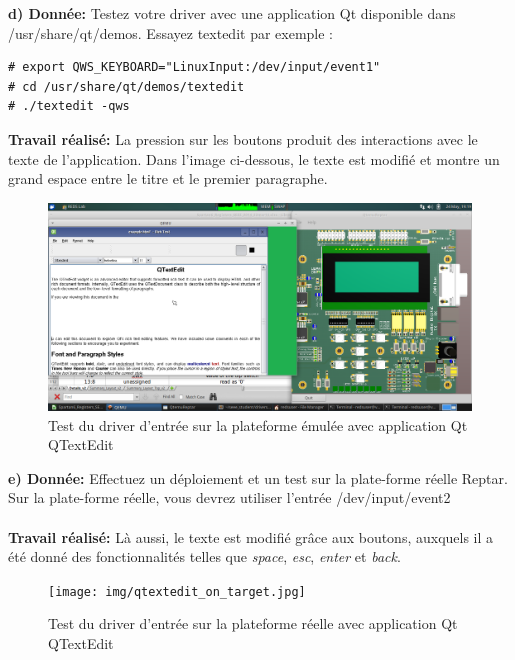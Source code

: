 \textbf{d) Donnée: }Testez votre driver avec une application Qt disponible dans /usr/share/qt/demos. Essayez textedit
par exemple : 
\begin{lstlisting}
# export QWS_KEYBOARD="LinuxInput:/dev/input/event1"
# cd /usr/share/qt/demos/textedit
# ./textedit -qws 
\end{lstlisting}
\textbf{Travail réalisé: }
La pression sur les boutons produit des interactions avec le texte de l'application. Dans l'image ci-dessous, le texte est modifié et montre un grand espace entre le titre et le premier paragraphe.
\begin{figure}[H]
	\begin{center}
		\includegraphics[width=17cm]{img/qtextedit_test_emulator.png}
		\caption{Test du driver d'entrée sur la plateforme émulée avec application Qt QTextEdit}
		\label{qtextedit_device_input_emul}
	\end{center}
\end{figure}

\textbf{e) Donnée: }Effectuez un déploiement et un test sur la plate-forme réelle Reptar. Sur la plate-forme réelle, vous
devrez utiliser l'entrée /dev/input/event2\\\\
\textbf{Travail réalisé: }Là aussi, le texte est modifié grâce aux boutons, auxquels il a été donné des fonctionnalités telles que \textit{space}, \textit{esc}, \textit{enter} et \textit{back}.
\begin{figure}[H]
	\begin{center}
		\texttt{[image: img/qtextedit\_on\_target.jpg]}
		\caption{Test du driver d'entrée sur la plateforme réelle avec application Qt QTextEdit}
		\label{qtextedit_device_input_reptar}
	\end{center}
\end{figure}

